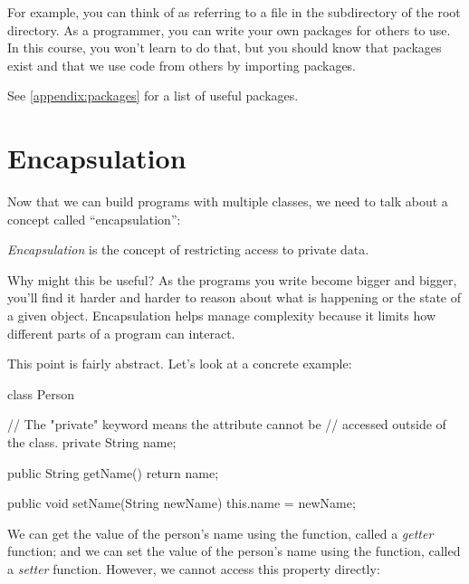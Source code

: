 For example, you can think of  as referring to a file  in the  subdirectory of the  root directory. As a programmer, you can write your own packages for others to use. In this course, you won't learn to do that, but you should know that packages exist and that we use code from others by importing packages.

See \ref{appendix:packages} for a list of useful packages.

\section{Encapsulation}

Now that we can build programs with multiple classes, we need to talk about a concept called ``encapsulation'':

\begin{definition}
\emph{Encapsulation} is the concept of restricting access to private data.
\end{definition}

Why might this be useful? As the programs you write become bigger and bigger, you'll find it harder and harder to reason about what is happening or the state of a given object. Encapsulation helps manage complexity because it limits how different parts of a program can interact.


This point is fairly abstract. Let's look at a concrete example:

\begin{code}
class Person {
  // The "private" keyword means the attribute cannot be
  // accessed outside of the class.
  private String name;

  public String getName() {
    return name;
  }

  public void setName(String newName) {
    this.name = newName;
  }
}
\end{code}

We can get the value of the person's name using the  function, called a \emph{getter} function; and we can set the value of the person's name using the  function, called a \emph{setter} function. However, we cannot access this property directly:

